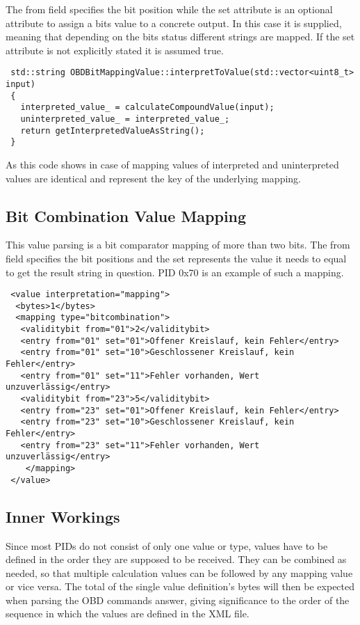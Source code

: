 The from field specifies the bit position while the set attribute is an optional attribute to assign a bits value to a concrete output. In this 
case it is supplied, meaning that depending  on the bits status different strings are mapped. If the set attribute is not explicitly stated it 
is assumed true.

\begin{lstlisting}
 std::string OBDBitMappingValue::interpretToValue(std::vector<uint8_t> input)
 {
   interpreted_value_ = calculateCompoundValue(input);
   uninterpreted_value_ = interpreted_value_;
   return getInterpretedValueAsString();
 }
\end{lstlisting}

As this code shows in case of mapping values of interpreted and uninterpreted values are identical and represent the key of the underlying mapping.

\subsection{Bit Combination Value Mapping}

This value parsing is a bit comparator mapping of more than two bits. The from field specifies the bit positions and the set represents the 
value it needs to equal to get the result string in question. PID 0x70 is an example of such a mapping.

\begin{lstlisting}
 <value interpretation="mapping">
  <bytes>1</bytes>
  <mapping type="bitcombination">
   <validitybit from="01">2</validitybit>
   <entry from="01" set="01">Offener Kreislauf, kein Fehler</entry>
   <entry from="01" set="10">Geschlossener Kreislauf, kein Fehler</entry>
   <entry from="01" set="11">Fehler vorhanden, Wert unzuverlässig</entry>
   <validitybit from="23">5</validitybit>
   <entry from="23" set="01">Offener Kreislauf, kein Fehler</entry>
   <entry from="23" set="10">Geschlossener Kreislauf, kein Fehler</entry>
   <entry from="23" set="11">Fehler vorhanden, Wert unzuverlässig</entry>
    </mapping>    
 </value>
\end{lstlisting}

\subsection{Inner Workings}

Since most PIDs do not consist of only one value or type, values have to be defined in the order they are supposed to be received. They can be 
combined as needed, so that multiple calculation values can be followed by any mapping value or vice versa. The total of the single value 
definition’s bytes will then be expected when parsing the OBD commands answer, giving significance to the order of the sequence in which the 
values are defined in the XML file.

